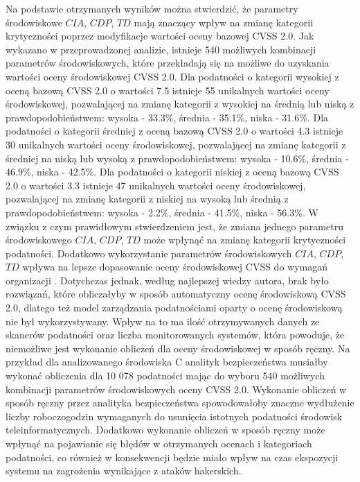 \bigbreak
Na podstawie otrzymanych wyników można stwierdzić, że parametry środowiskowe $CIA$, $CDP$, $TD$ mają znaczący wpływ na zmianę kategorii krytyczności poprzez modyfikacje wartości oceny bazowej CVSS 2.0. Jak wykazano w przeprowadzonej analizie, istnieje 540 możliwych kombinacji parametrów środowiskowych, które przekładają się na możliwe do uzyskania wartości oceny środowiskowej CVSS 2.0. Dla podatności o kategorii wysokiej z oceną bazową CVSS 2.0 o wartości 7.5 istnieje 55 unikalnych wartości oceny środowiskowej, pozwalającej na zmianę kategorii z wysokiej na średnią lub niską z prawdopodobieństwem: wysoka - 33.3\%, średnia - 35.1\%, niska - 31.6\%. Dla podatności o kategorii średniej z oceną bazową CVSS 2.0 o wartości 4.3 istnieje 30 unikalnych wartości oceny środowiskowej, pozwalającej na zmianę kategorii z średniej na niską lub wysoką z prawdopodobieństwem: wysoka - 10.6\%, średnia - 46.9\%, niska - 42.5\%. Dla podatności o kategorii niskiej z oceną bazową CVSS 2.0 o wartości 3.3 istnieje 47 unikalnych wartości oceny środowiskowej, pozwalającej na zmianę kategorii z niskiej na wysoką lub średnią z prawdopodobieństwem: wysoka - 2.2\%, średnia - 41.5\%, niska - 56.3\%. W związku z czym prawidłowym stwierdzeniem jest, że zmiana jednego parametru środowiskowego $CIA$, $CDP$, $TD$ może wpłynąć na zmianę kategorii krytyczności podatności. Dodatkowo wykorzystanie parametrów środowiskowych $CIA$, $CDP$, $TD$ wpływa na lepsze dopasowanie oceny środowiskowej CVSS do wymagań organizacji \cite{fruhwirth2009improving, wang2015vulnerability, gallon2010impact}. Dotychczas jednak,  według najlepszej wiedzy autora, brak było rozwiązań, które obliczałyby w sposób automatyczny ocenę środowiskową CVSS 2.0, dlatego też model zarządzania podatnościami oparty o ocenę środowiskową nie był wykorzystywany. Wpływ na to ma ilość otrzymywanych danych ze skanerów podatności oraz liczba monitorowanych systemów, która powoduje, że niemożliwe jest wykonanie obliczeń dla oceny środowiskowej w sposób ręczny. Na przykład dla analizowanego środowiska C analityk bezpieczeństwa musiałby wykonać obliczenia dla 10 078 podatności mając do wyboru 540 możliwych kombinacji parametrów środowiskowych oceny CVSS 2.0. Wykonanie obliczeń w sposób ręczny przez analityka bezpieczeństwa spowodowałoby znaczne wydłużenie liczby roboczogodzin wymaganych do usunięcia istotnych podatności środowisk teleinformatycznych. Dodatkowo wykonanie obliczeń w sposób ręczny może wpłynąć na pojawianie się błędów w otrzymanych ocenach i kategoriach podatności, co również w konsekwencji będzie miało wpływ na czas ekspozycji systemu na zagrożenia wynikające z ataków hakerskich. 
